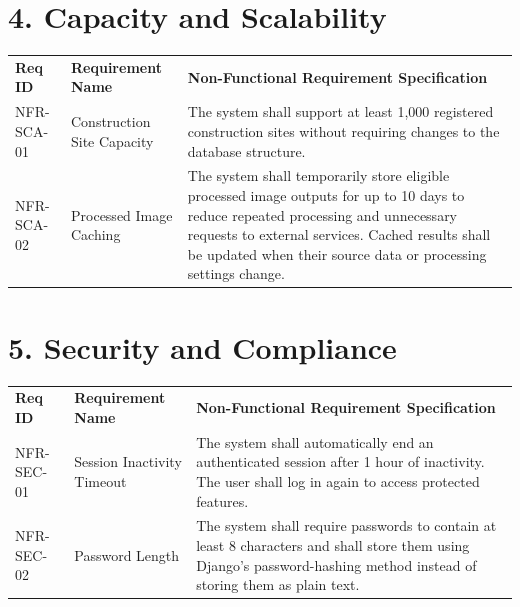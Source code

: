 \documentclass[12pt,a4paper]{report}
\begin{document}
\label{_rh6k7hor8fco}{}

\section{4. Capacity and Scalability}\label{capacity-and-scalability}

\begin{longtable}[]{@{}
  >{\raggedright\arraybackslash}p{}
  >{\raggedright\arraybackslash}p{}
  >{\raggedright\arraybackslash}p{}@{}}
\toprule\noalign{}
\endhead
\bottomrule\noalign{}
\endlastfoot
\textbf{Req ID} & \textbf{Requirement Name} & \textbf{Non-Functional
Requirement Specification} \\
NFR-SCA-01 & Construction Site Capacity & The system shall support at
least 1,000 registered construction sites without requiring changes to
the database structure. \\
NFR-SCA-02 & Processed Image Caching & The system shall temporarily
store eligible processed image outputs for up to 10 days to reduce
repeated processing and unnecessary requests to external services.
Cached results shall be updated when their source data or processing
settings change. \\
\end{longtable}
\vspace{1cm}
\section{5. Security and Compliance}\label{security-and-compliance}

\begin{longtable}[]{@{}
  >{\raggedright\arraybackslash}p{}
  >{\raggedright\arraybackslash}p{}
  >{\raggedright\arraybackslash}p{}@{}}
\toprule\noalign{}
\endhead
\bottomrule\noalign{}
\endlastfoot
\textbf{Req ID} & \textbf{Requirement Name} & \textbf{Non-Functional
Requirement Specification} \\
NFR-SEC-01 & Session Inactivity Timeout & The system shall automatically
end an authenticated session after 1 hour of inactivity. The user shall
log in again to access protected features. \\
NFR-SEC-02 & Password Length & The system shall require passwords to
contain at least 8 characters and shall store them using Django's
password-hashing method instead of storing them as plain text. \\
\end{longtable}
\end{document}
